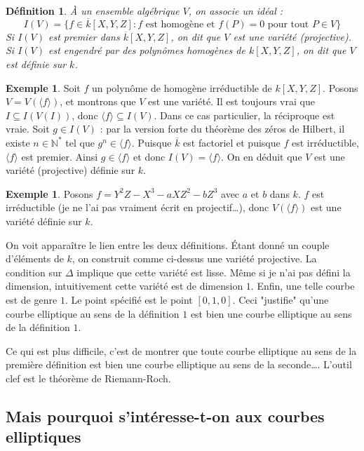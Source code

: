 \documentclass{article}
\theoremstyle{plain}%
\newtheorem{deff}[thm]{Définition}
\theoremstyle{definition}%
\newtheorem{ex}[thm]{Exemple}
\newcommand{\N}{\mathbb{N}}
\begin{document}
\begin{deff}
  À un ensemble algébrique $V$, on associe un idéal :
  $$I(V) = \{ f\in \overline{k}[X, Y, Z] : f \text{ est homogène et } f(P) = 0 \text{ pour tout } P\in V \}$$
  Si $I(V)$ est premier dans $ \overline{k}[X, Y, Z] $, on dit que $V$ est une variété (projective). Si $I(V)$ est engendré par des polynômes homogènes de $k[X, Y, Z]$, on dit que $V$ est définie sur $k$.  
\end{deff}



\begin{ex}
  Soit $f$ un polynôme de homogène irréductible de $k[X, Y, Z]$. Posons $V = V(\langle f \rangle)$, et montrons que $V$ est une variété. 
  Il est toujours vrai que $I \subseteq I(V(I))$, donc $\langle f \rangle \subseteq I(V)$. 
  Dans ce cas particulier, la réciproque est vraie. Soit $g\in I(V)$ : par la version forte du théorème des zéros de Hilbert, il existe $n\in\N^*$ tel que $g^n\in \langle f \rangle$.
  Puisque $\overline{k}$ est factoriel et puisque $f$ est irréductible,  $\langle f \rangle$ est premier. Ainsi $g\in \langle f \rangle$ et donc $I(V) = \langle f \rangle$.
  On en déduit que $V$ est une variété (projective) définie sur $k$.
\end{ex}

\begin{ex}
  Posons $f = Y^2 Z - X^3 -aXZ^2 -b Z^3$ avec $a$ et $b$ dans $k$. $f$ est irréductible (je ne l'ai pas vraiment écrit en projectif\ldots), donc $V(\langle f \rangle)$ est une variété définie sur $k$.
\end{ex}

On voit apparaître le lien entre les deux définitions. Étant donné un couple d'éléments de $k$, on construit comme ci-dessus une variété projective. La condition sur $\Delta$ implique que cette variété est lisse. Même si je n'ai pas défini la dimension, intuitivement cette variété est de dimension $1$. Enfin, une telle courbe est de genre $1$. Le point spécifié est le point $[0, 1, 0]$. Ceci "justifie" qu'une courbe elliptique au sens de la définition $1$ est bien une courbe elliptique au sens de la définition $1$. 

Ce qui est plus difficile, c'est de montrer que toute courbe elliptique au sens de la première définition est bien une courbe elliptique au sens de la seconde\ldots. L'outil clef est le théorème de Riemann-Roch.

\subsection{Mais pourquoi s'intéresse-t-on aux courbes elliptiques}
\end{document}
